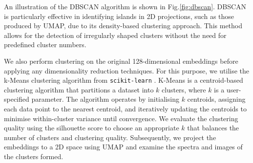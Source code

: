 \documentclass[draft, a4paper,12pt]{article}
\begin{document}


An illustration of the DBSCAN algorithm is shown in Fig.\ref{fig:dbscan}. DBSCAN is particularly effective in identifying islands in 2D projections, such as those produced by UMAP, due to its density-based clustering approach. This method allows for the detection of irregularly shaped clusters without the need for predefined cluster numbers.

We also perform clustering on the original 128-dimensional embeddings before applying any dimensionality reduction techniques. For this purpose, we utilise the k-Means clustering  algorithm \cite{udl} from \verb|scikit-learn| . K-Means is a centroid-based clustering algorithm that partitions a dataset into \( k \) clusters, where \( k \) is a user-specified parameter. The algorithm operates by initialising \( k \) centroids, assigning each data point to the nearest centroid, and iteratively updating the centroids to minimise within-cluster variance until convergence. We evaluate the clustering quality using the silhouette score \cite{silhouette} to choose an appropriate \( k \) that balances the number of clusters and clustering quality. Subsequently, we project the embeddings to a 2D space using UMAP and examine the spectra and images of the clusters formed.
\end{document}
